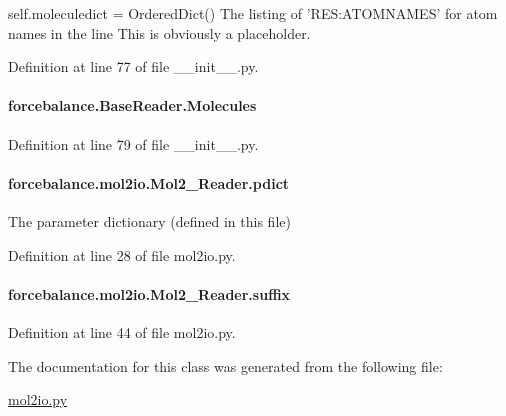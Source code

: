 self.\-moleculedict = Ordered\-Dict() The listing of 'R\-E\-S\-:A\-T\-O\-M\-N\-A\-M\-E\-S' for atom names in the line This is obviously a placeholder. 

Definition at line 77 of file \-\_\-\-\_\-init\-\_\-\-\_\-.\-py.

\hypertarget{classforcebalance_1_1BaseReader_a4369b5fb663a83b11602daa71db6862e}{
\paragraph[{Molecules}]{\setlength{\rightskip}{0pt plus 5cm}forcebalance.\-Base\-Reader.\-Molecules\hspace{0.3cm}{\ttfamily [inherited]}}}\label{classforcebalance_1_1BaseReader_a4369b5fb663a83b11602daa71db6862e}


Definition at line 79 of file \-\_\-\-\_\-init\-\_\-\-\_\-.\-py.

\hypertarget{classforcebalance_1_1mol2io_1_1Mol2__Reader_a3d0014f83cdf754983feade05fa162e2}{
\paragraph[{pdict}]{\setlength{\rightskip}{0pt plus 5cm}forcebalance.\-mol2io.\-Mol2\-\_\-\-Reader.\-pdict}}\label{classforcebalance_1_1mol2io_1_1Mol2__Reader_a3d0014f83cdf754983feade05fa162e2}


The parameter dictionary (defined in this file) 



Definition at line 28 of file mol2io.\-py.

\hypertarget{classforcebalance_1_1mol2io_1_1Mol2__Reader_a3c5f0f93848a5d83a50facb1d01fe3b1}{
\paragraph[{suffix}]{\setlength{\rightskip}{0pt plus 5cm}forcebalance.\-mol2io.\-Mol2\-\_\-\-Reader.\-suffix}}\label{classforcebalance_1_1mol2io_1_1Mol2__Reader_a3c5f0f93848a5d83a50facb1d01fe3b1}


Definition at line 44 of file mol2io.\-py.



The documentation for this class was generated from the following file\-:\begin{DoxyCompactItemize}
\item 
\hyperlink{mol2io_8py}{mol2io.\-py}\end{DoxyCompactItemize}
